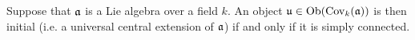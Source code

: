         \begin{proposition}
            Suppose that $\mathfrak{a}$ is a Lie algebra over a field $k$. An object $\mathfrak{u} \in \mathrm{Ob}( \mathrm{Cov}_k(\mathfrak{a}) )$ is then initial (i.e. a universal central extension of $\mathfrak{a}$) if and only if it is simply connected. 
        \end{proposition}